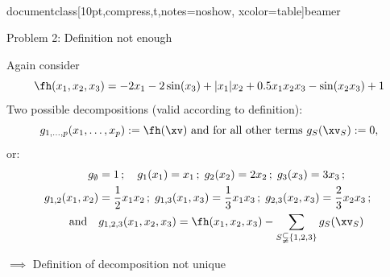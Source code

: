\\documentclass[10pt,compress,t,notes=noshow, xcolor=table]{beamer}
\begin{document}
\begin{frame}{Problem 2: Definition not enough}

    \begin{example}
        Again consider
        $$
        \fh(x_1, x_2, x_3) = - 2x_1 - 2\sin(x_3) + |x_1|x_2 + 0.5 x_1 x_2 x_3 - \sin(x_2 x_3) + 1
        $$
        \pause
        Two possible decompositions (valid according to definition):
        $$
            g_{1, \dots, p}(x_1, \dots, x_p) := \fh(\xv) \text{ and for all other terms } g_S(\xv_S) := 0 ,
        $$
        or:
        \begin{align*}
            g_\emptyset & = 1 \,;\quad
            g_1(x_1) = x_1 \,;\;
            g_2(x_2) = 2x_2 \,;\;
            g_3(x_3) = 3x_3 \,;\quad \\
            g_{1,2}(x_1, x_2) & = \frac{1}{2} x_1 x_2 \,;\;
            g_{1,3}(x_1, x_3) = \frac{1}{3} x_1 x_3 \,;\;
            g_{2,3}(x_2, x_3) = \frac{2}{3} x_2 x_3 \,;\; \\
            \text{ and} \quad
            & g_{1,2,3}(x_1, x_2, x_3) = \fh(x_1, x_2, x_3) - \sum_{S \subsetneqq \{1,2,3\}} g_S(\xv_S)
        \end{align*}
    \end{example}
    \pause
    \(\implies\) Definition of decomposition not unique \\
    
\end{frame}
\end{document}
